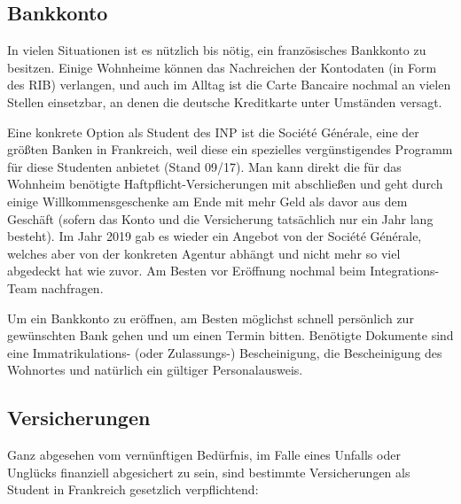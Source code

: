 \documentclass[11pt,a4paper]{article}
\begin{document}
	\subsection{Bankkonto}
	
	In vielen Situationen ist es nützlich bis nötig, ein französisches Bankkonto zu besitzen. Einige Wohnheime können das Nachreichen der Kontodaten (in Form des RIB) verlangen, und auch im Alltag ist die Carte Bancaire nochmal an vielen Stellen einsetzbar, an denen die deutsche Kreditkarte unter Umständen versagt.
	
  Eine konkrete Option als Student des INP ist die Société Générale, eine der größten Banken in Frankreich, weil diese ein spezielles vergünstigendes Programm für diese Studenten anbietet (Stand 09/17). Man kann direkt die für das Wohnheim benötigte Haftpflicht-Versicherungen mit abschließen und geht durch einige Willkommensgeschenke am Ende mit mehr Geld als davor aus dem Geschäft (sofern das Konto und die Versicherung tatsächlich nur ein Jahr lang besteht). Im Jahr 2019 gab es wieder ein Angebot von der Société Générale, welches aber von der konkreten Agentur abhängt und nicht mehr so viel abgedeckt hat wie zuvor. Am Besten vor Eröffnung nochmal beim Integrations-Team nachfragen.
	
	Um ein Bankkonto zu eröffnen, am Besten möglichst schnell persönlich zur gewünschten Bank gehen und um einen Termin bitten. Benötigte Dokumente sind eine Immatrikulations- (oder Zulassungs-) Bescheinigung, die Bescheinigung des Wohnortes und natürlich ein gültiger Personalausweis.
	
	\subsection{Versicherungen}
	
	Ganz abgesehen vom vernünftigen Bedürfnis, im Falle eines Unfalls oder Unglücks finanziell abgesichert zu sein, sind bestimmte Versicherungen als Student in Frankreich gesetzlich verpflichtend:
	
\end{document}
